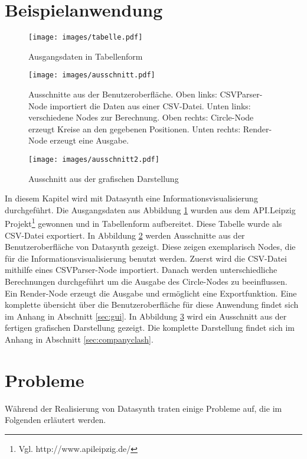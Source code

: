 \documentclass[a4paper, 
               12pt,
               DIV=calc,
               version=first,
               pdftex,
               headsepline,
               footsepline,
               bibtotocnumbered,
               liststotocnumbered]{scrreprt}
\begin{document}
\section{Beispielanwendung}
\label{sec:Beispielanwendung}
\begin{figure}
\centering
\texttt{[image: images/tabelle.pdf]}
\caption{Ausgangsdaten in Tabellenform}
\label{fig:apitabelle}
\end{figure}
\begin{figure}
\centering
\texttt{[image: images/ausschnitt.pdf]}
\caption{Ausschnitte aus der Benutzeroberfläche.
Oben links: CSVParser-Node importiert die Daten aus einer CSV-Datei.
Unten links: verschiedene Nodes zur Berechnung.
Oben rechts: Circle-Node erzeugt Kreise an den gegebenen Positionen.
Unten rechts: Render-Node erzeugt eine Ausgabe.}
\label{fig:guiausschnitt}
\end{figure}
\begin{figure}
\centering
\texttt{[image: images/ausschnitt2.pdf]}
\caption{Ausschnitt aus der grafischen Darstellung}
\label{fig:companyausschnitt}
\end{figure}
In diesem Kapitel wird mit Datasynth eine Informationsvisualisierung durchgeführt.
Die Ausgangsdaten aus Abbildung \ref{fig:apitabelle} wurden aus dem API.Leipzig Projekt\footnote{Vgl.
http://www.apileipzig.de/} gewonnen und in Tabellenform aufbereitet. Diese Tabelle wurde
als CSV-Datei exportiert.
In Abbildung \ref{fig:guiausschnitt} werden Ausschnitte aus der Benutzeroberfläche von
Datasynth gezeigt. Diese zeigen exemplarisch Nodes, die für die Informationsvisualisierung
benutzt werden. Zuerst wird die CSV-Datei mithilfe eines CSVParser-Node importiert. Danach
werden unterschiedliche Berechnungen durchgeführt um die Ausgabe des Circle-Nodes zu beeinflussen.
Ein Render-Node erzeugt die Ausgabe und ermöglicht eine Exportfunktion.
Eine komplette übersicht über die Benutzeroberfläche für diese Anwendung findet sich im Anhang
in Abschnitt \ref{sec:gui}.
In Abbildung \ref{fig:companyausschnitt} wird ein Ausschnitt aus der fertigen grafischen
Darstellung gezeigt. Die komplette Darstellung findet sich im Anhang in Abschnitt \ref{sec:companyclash}.

\section{Probleme}
\label{sec:Probleme}
Während der Realisierung von Datasynth traten einige Probleme auf, die im Folgenden
erläutert werden.
\end{document}
